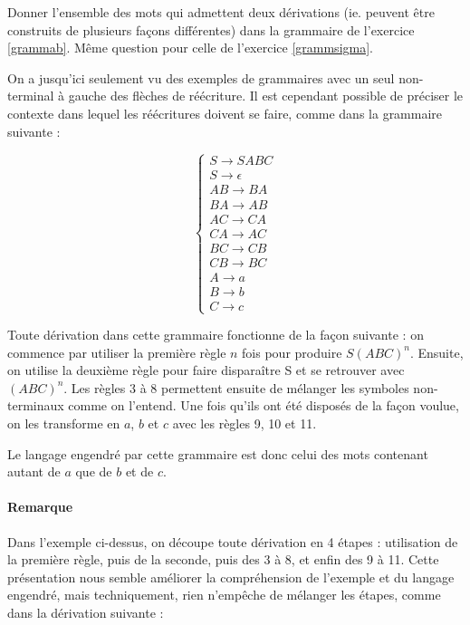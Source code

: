 \begin{exercice}
Donner l'ensemble des mots qui admettent deux dérivations (ie. peuvent être construits de plusieurs façons différentes) dans la grammaire de l'exercice \ref{grammab}. Même question pour celle de l'exercice \ref{grammsigma}.
\end{exercice}

\begin{example}
\label{ggramabcn}
On a jusqu'ici seulement vu des exemples de grammaires avec un seul non-terminal à gauche des flèches de réécriture. Il est cependant possible de préciser le contexte dans lequel les réécritures doivent se faire, comme dans la grammaire suivante :

\[
\begin{cases}
S \rightarrow SABC \\
S \rightarrow \epsilon \\
AB \rightarrow BA \\
BA \rightarrow AB \\
AC \rightarrow CA \\
CA \rightarrow AC \\
BC \rightarrow CB \\
CB \rightarrow BC \\
A \rightarrow a \\
B \rightarrow b \\
C \rightarrow c
\end{cases}
\]

Toute dérivation dans cette grammaire fonctionne de la façon suivante : on commence par utiliser la première règle $n$ fois pour produire $S(ABC)^n$. Ensuite, on utilise la deuxième règle pour faire disparaître S et se retrouver avec $(ABC)^n$. Les règles 3 à 8 permettent ensuite de mélanger les symboles non-terminaux comme on l'entend. Une fois qu'ils ont été disposés de la façon voulue, on les transforme en $a$, $b$ et $c$ avec les règles 9, 10 et 11.

Le langage engendré par cette grammaire est donc celui des mots contenant autant de $a$ que de $b$ et de $c$.
\end{example}

\paragraph{Remarque} Dans l'exemple ci-dessus, on découpe toute dérivation en 4 étapes : utilisation de la première règle, puis de la seconde, puis des 3 à 8, et enfin des 9 à 11. Cette présentation nous semble améliorer la compréhension de l'exemple et du langage engendré, mais techniquement, rien n'empêche de mélanger les étapes, comme dans la dérivation suivante :


